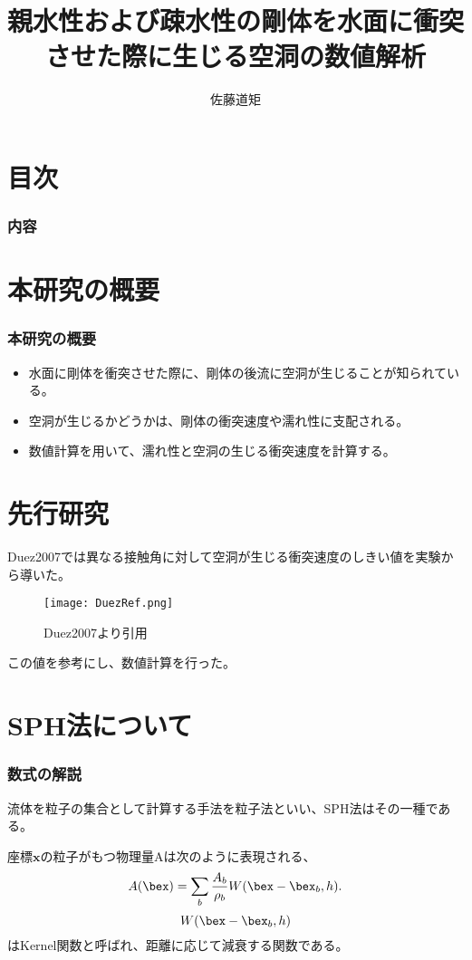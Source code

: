 \documentclass[12pt]{beamer}
\title{親水性および疎水性の剛体を水面に衝突させた際に生じる空洞の数値解析}
\author{佐藤道矩}
\institute[京都大学大学院]{流体物理学研究室}
\begin{document}
\begin{frame}\frametitle{}
\titlepage
\end{frame}

\section{目次}
\begin{frame}\frametitle{内容}
\tableofcontents
\end{frame}

\section{本研究の概要}
\begin{frame}\frametitle{本研究の概要}
  \begin{itemize}
    \item 水面に剛体を衝突させた際に、剛体の後流に空洞が生じることが知られている。

    \item 空洞が生じるかどうかは、剛体の衝突速度や濡れ性に支配される。

    \item 数値計算を用いて、濡れ性と空洞の生じる衝突速度を計算する。

    \end{itemize}
\end{frame}

\section{先行研究}
\begin{frame}
  Duez2007では異なる接触角に対して空洞が生じる衝突速度のしきい値を実験から導いた。
  \begin{figure}[ht]
    \centering
    \texttt{[image: DuezRef.png]}
    \caption{Duez2007より引用\label{fig:DuezRef} }
  \end{figure}
この値を参考にし、数値計算を行った。
\end{frame}


\section{SPH法について}
\begin{frame}\frametitle{数式の解説}
  流体を粒子の集合として計算する手法を粒子法といい、SPH法はその一種である。
  
  座標$\bm{x}$の粒子がもつ物理量Aは次のように表現される、
  \[A(\bex)=\sum_b \frac{A_b}{\rho_b} W(\bex-\bex_b,h).\]
  \[W(\bex-\bex_b, h)\]はKernel関数と呼ばれ、距離に応じて減衰する関数である。
\end{frame}
\end{document}
